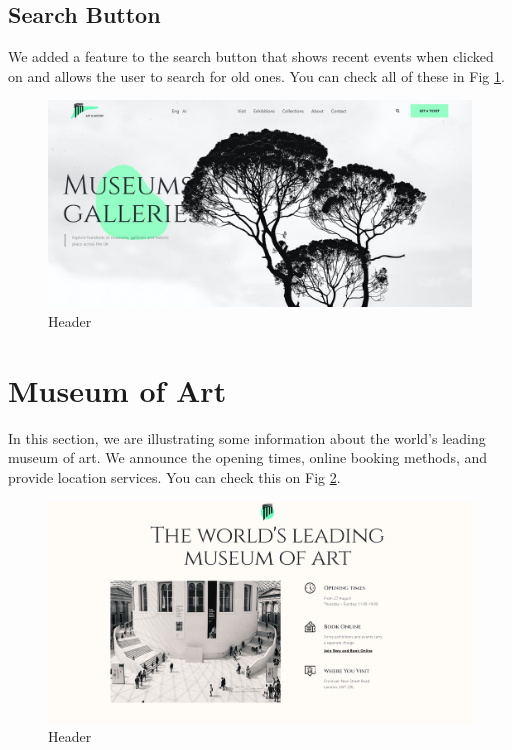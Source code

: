 \documentclass{article}
\begin{document}
\subsection{Search Button}
We added a feature to the search button that shows recent events when clicked on and allows the user to search for old ones. You can check all of these in Fig \ref{fig:header}. 
\begin{figure}
	\centering
	\includegraphics[width=\linewidth]{img/header.PNG}
	\caption{Header}
	\label{fig:header}
\end{figure} 
\section{Museum of Art}
In this section, we are illustrating some information about the world's leading museum of art. We announce the opening times, online booking methods, and provide location services.  You can check this on Fig \ref{fig:leading}. 
\begin{figure}
	\centering
	\includegraphics[width=\linewidth]{img/leading.PNG}
	\caption{Header}
	\label{fig:leading}
\end{figure} 
\end{document}
